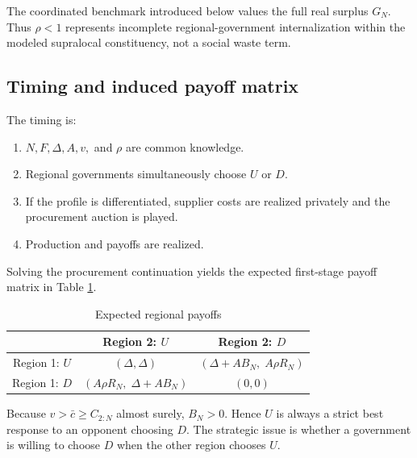 The coordinated benchmark introduced below values the full real surplus $G_N$. Thus $\rho<1$ represents incomplete regional-government internalization within the modeled supralocal constituency, not a social waste term.

\subsection{Timing and induced payoff matrix}

The timing is:
\begin{enumerate}[label=(\arabic*)]
\item $N,F,\Delta,A,v,$ and $\rho$ are common knowledge.
\item Regional governments simultaneously choose $U$ or $D$.
\item If the profile is differentiated, supplier costs are realized privately and the procurement auction is played.
\item Production and payoffs are realized.
\end{enumerate}

Solving the procurement continuation yields the expected first-stage payoff matrix in Table \ref{tab:payoffs}.

\begin{table}[ht]
\centering
\caption{Expected regional payoffs}
\label{tab:payoffs}
\begin{tabular}{c c c}
\toprule
& Region 2: $U$ & Region 2: $D$\\
\midrule
Region 1: $U$ & $(\Delta,\Delta)$ & $(\Delta+A B_N,\; A\rho R_N)$\\
Region 1: $D$ & $(A\rho R_N,\; \Delta+A B_N)$ & $(0,0)$\\
\bottomrule
\end{tabular}
\end{table}

Because $v>\bar c\ge C_{2:N}$ almost surely, $B_N>0$. Hence $U$ is always a strict best response to an opponent choosing $D$. The strategic issue is whether a government is willing to choose $D$ when the other region chooses $U$.

